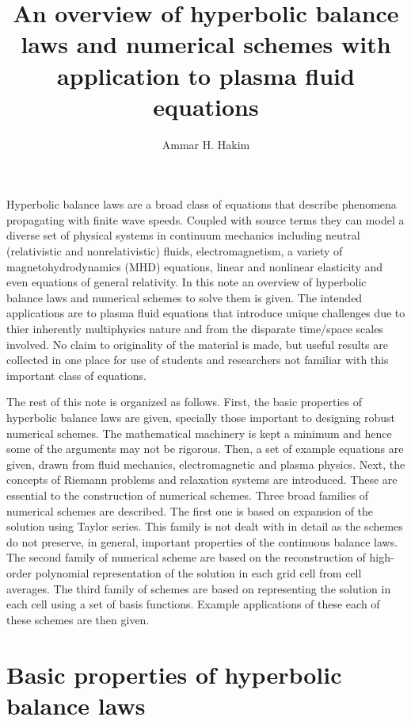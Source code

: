 \documentclass[11pt, reqno]{amsart}
\title{An overview of hyperbolic balance laws and numerical schemes
  with application to plasma fluid equations}%
\author{Ammar H. Hakim}%
\date{}
\theoremstyle{definition}
\begin{document}
\maketitle

Hyperbolic balance laws are a broad class of equations that describe
phenomena propagating with finite wave speeds. Coupled with source
terms they can model a diverse set of physical systems in continuum
mechanics including neutral (relativistic and nonrelativistic) fluids,
electromagnetism, a variety of magnetohydrodynamics (MHD) equations,
linear and nonlinear elasticity and even equations of general
relativity. In this note an overview of hyperbolic balance laws and
numerical schemes to solve them is given. The intended applications
are to plasma fluid equations that introduce unique challenges due to
thier inherently multiphysics nature and from the disparate time/space
scales involved. No claim to originality of the material is made, but
useful results are collected in one place for use of students and
researchers not familiar with this important class of equations.

The rest of this note is organized as follows. First, the basic
properties of hyperbolic balance laws are given, specially those
important to designing robust numerical schemes. The mathematical
machinery is kept a minimum and hence some of the arguments may not be
rigorous. Then, a set of example equations are given, drawn from fluid
mechanics, electromagnetic and plasma physics. Next, the concepts of
Riemann problems and relaxation systems are introduced. These are
essential to the construction of numerical schemes. Three broad
families of numerical schemes are described. The first one is based on
expansion of the solution using Taylor series. This family is not
dealt with in detail as the schemes do not preserve, in general,
important properties of the continuous balance laws. The second family
of numerical scheme are based on the reconstruction of high-order
polynomial representation of the solution in each grid cell from cell
averages. The third family of schemes are based on representing the
solution in each cell using a set of basis functions. Example
applications of these each of these schemes are then given.

\section{Basic properties of hyperbolic balance laws}
\end{document}
